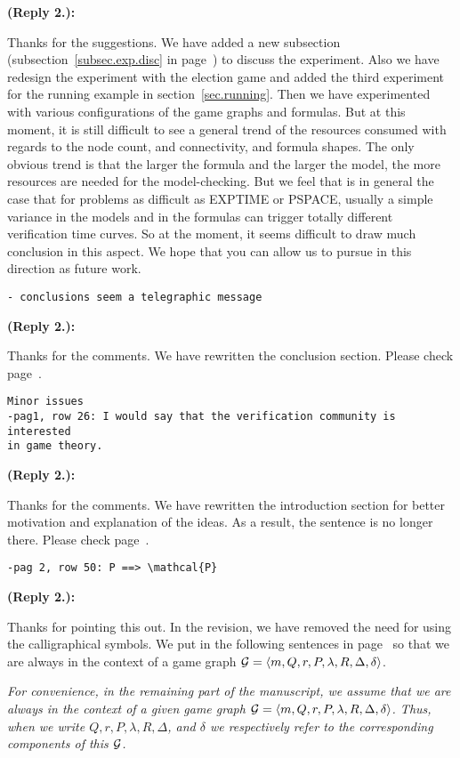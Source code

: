 \documentclass[11pt]{article}
\newcommand{\calg}{{\cal G}}
\newcounter{cabbage1}
\newcounter{cabbage2}
\newcounter{cabbage3}
\newcounter{bean1}
\newcounter{bean2}
\newcounter{bean3}
\newcounter{bean4}
\newcounter{bean5}
\newcounter{bean6}
\newenvironment{reply2}{\begin{list}{\bf (Reply 2.\arabic{bean2}):} 
        {\usecounter{bean2}\setcounter{bean2}{\value{cabbage2}} 
        \item \setcounter{cabbage2}{\value{bean2}} 
        }
}{\end{list}}
\begin{document}
\begin{reply2} 
Thanks for the suggestions. 
We have added a new subsection (subsection~\ref{subsec.exp.disc} in page~\pageref{subsec.exp.disc}) 
to discuss the experiment. 
Also we have redesign the experiment with the election game and added the third experiment for 
the running example in section~\ref{sec.running}.  
Then we have experimented with various configurations of the game graphs and formulas. 
But at this moment, it is still difficult to see a general trend of the resources consumed 
with regards to the node count, and connectivity, and formula shapes. 
The only obvious trend is that the larger the formula and the larger the model, the more resources 
are needed for the model-checking.  
But we feel that is in general the case that for problems as difficult as EXPTIME or PSPACE, 
usually a simple variance in the models and in the formulas can trigger totally different verification 
time curves.  
So at the moment, it seems difficult to draw much conclusion in this aspect. 
We hope that you can allow us to pursue in this direction as future work.  
\end{reply2} 
\begin{verbatim} 
- conclusions seem a telegraphic message 
\end{verbatim}
\begin{reply2} 
Thanks for the comments. 
We have rewritten the conclusion section.  
Please check page~\pageref{sec.conc}. 
\end{reply2} 
\begin{verbatim} 
Minor issues 
-pag1, row 26: I would say that the verification community is interested 
in game theory. 
\end{verbatim}
\begin{reply2} 
Thanks for the comments. 
We have rewritten the introduction section for better motivation and explanation of the ideas. 
As a result, the sentence is no longer there.  
Please check page~\pageref{sec.intro}. 
\end{reply2} 
\begin{verbatim} 
-pag 2, row 50: P ==> \mathcal{P} 
\end{verbatim}
\begin{reply2} 
Thanks for pointing this out. 
In the revision, we have removed the need for using the calligraphical symbols. 
We put in the following sentences in page~\pageref{reply2.calp} 
so that we are always in the context of a game graph 
$\calg=\langle m,Q,r,P,\lambda,R,\Delta,\delta\rangle$.
\begin{center} 
\parbox{120mm}{\em 
For convenience, in the remaining part of the 
manuscript, we assume that we are always in the context 
of a given game graph
$\calg=\langle m,Q,r,P,\lambda,R,\Delta,\delta\rangle$.
Thus, when we write $Q,r,P,\lambda,R,\Delta$, and $\delta$ 
we respectively refer to the corresponding components of this $\calg$. 
}
\end{center}  
\end{reply2} 
\end{document}
